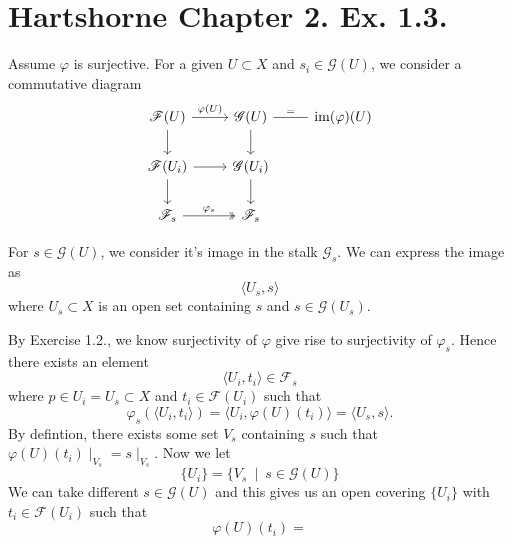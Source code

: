 \section{Hartshorne Chapter 2. Ex. 1.3.}

Assume $\varphi$ is surjective. For a given $U\subset X$ and $s_i\in\mathscr G(U)$, we consider a commutative diagram 
\[\begin{tikzcd}
	{\mathscr F(U)} & {\mathscr G(U)} & {\operatorname{im}(\varphi)(U)} \\
	{\mathscr F(U_i)} & {\mathscr G(U_i)} \\
	{\mathscr F_{s}} & {\mathscr F_{s}}
	\arrow["{\varphi(U)}", from=1-1, to=1-2]
	\arrow[from=1-1, to=2-1]
	\arrow[from=1-2, to=2-2]
	\arrow["{=}", no head, from=1-2, to=1-3]
	\arrow[from=2-1, to=2-2]
	\arrow[from=2-1, to=3-1]
	\arrow[from=2-2, to=3-2]
	\arrow["{\varphi_s}", two heads, from=3-1, to=3-2]
\end{tikzcd}\]

For $s\in \mathscr G(U)$, we consider it's image in the stalk $\mathscr G_s$. We can express the image as 
\[\langle U_s,s\rangle\] where $U_s\subset X$ is an open set containing $s$ and $s\in\mathscr G(U_s)$.

By Exercise 1.2., we know surjectivity of $\varphi$ give rise to surjectivity of $\varphi_s$. 
Hence there exists an element 
\[\langle U_i,t_i\rangle\in \mathscr F_s\] where $p\in U_i=U_s\subset X$ and $t_i\in\mathscr F(U_i)$ such that 
\[\varphi_s(\langle U_i,t_i\rangle)=\langle U_i,\varphi(U)(t_i)\rangle=\langle U_s,s\rangle.\]
By defintion, there exists some set $V_s$ containing $s$ such that $\varphi(U)(t_i)\mid_{V_s}=s\mid_{V_s}$.
Now we let \[\{U_i\}=\{V_s ~\mid~ s\in\mathscr G(U)\}\]
We can take different $s\in\mathscr G(U)$ and this gives us an open covering $\{U_i\}$ with $t_i\in\mathscr F(U_i)$ such that 
\[\varphi(U)(t_i)=\]  